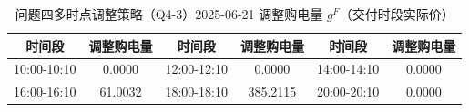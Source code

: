 \begin{table}[htbp]
\centering
\caption{问题四多时点调整策略（Q4-3）2025-06-21 调整购电量 $g^F$（交付时段实际价）}\label{tab:q4-3-adjust}
\normalsize\setlength{\tabcolsep}{5pt}
\begin{tabular}{@{}cccccc@{}}
\toprule
时间段 & 调整购电量 & 时间段 & 调整购电量 & 时间段 & 调整购电量 \\
\midrule
10:00-10:10 & 0.0000 & 12:00-12:10 & 0.0000 & 14:00-14:10 & 0.0000 \\
16:00-16:10 & 61.0032 & 18:00-18:10 & 385.2115 & 20:00-20:10 & 0.0000 \\
\bottomrule
\end{tabular}
\end{table}
